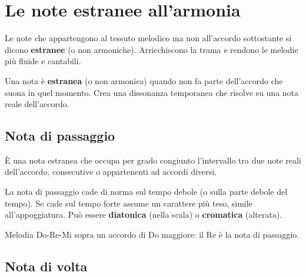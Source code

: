 \chapter{Le note estranee all'armonia}
\label{chap:noteestranee}

Le note che appartengono al tessuto melodico ma non all'accordo sottostante si dicono \textbf{estranee} (o non armoniche). Arricchiscono la trama e rendono le melodie più fluide e cantabili.

\begin{definizione}
    \label{def:nota_estranea}
    Una nota è \textbf{estranea} (o non armonica) quando non fa parte dell'accordo che suona in quel momento. Crea una dissonanza temporanea che risolve su una nota reale dell'accordo.
\end{definizione}

\section{Nota di passaggio}
\label{sec:nota_passaggio}

\begin{definizione}
    È una nota estranea che occupa per grado congiunto l'intervallo tra due note reali dell'accordo, consecutive o appartenenti ad accordi diversi.
\end{definizione}

\begin{regola}
    La nota di passaggio cade di norma sul tempo debole (o sulla parte debole del tempo). Se cade sul tempo forte assume un carattere più teso, simile all'appoggiatura. Può essere \textbf{diatonica} (nella scala) o \textbf{cromatica} (alterata).
\end{regola}

\begin{esempio}
    Melodia Do-Re-Mi sopra un accordo di Do maggiore: il Re è la nota di passaggio.
\end{esempio}

\begin{esempio}
\end{esempio}

\section{Nota di volta}
\label{sec:nota_volta}

